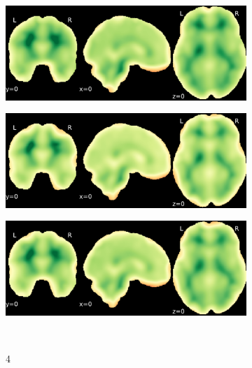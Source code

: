 \documentclass{article}
\begin{document}
\begin{landscape}
\begin{figure}
\begin{subfigure}[t]{0.2\paperheight}
        \end{subfigure}
        \begin{subfigure}[t]{0.2\paperheight}
            \centering
            \includegraphics[width=\textwidth]{figures/sig/15mm/rr_ds000256_sub-CTS201_sig.pdf}
        \end{subfigure}
        \begin{subfigure}[t]{0.2\paperheight}
            \centering
            \includegraphics[width=\textwidth]{figures/sig/15mm/rs_ds000256_sub-CTS201_sig.pdf}
        \end{subfigure}
        \begin{subfigure}[t]{0.2\paperheight}
            \centering
            \includegraphics[width=\textwidth]{figures/sig/15mm/rr.rs_ds000256_sub-CTS201_sig.pdf}
        \end{subfigure} \\
        \begin{subfigure}[b][][c]{0.01\paperwidth} 4 \vspace*{15pt} \end{subfigure}

\end{figure}
\end{landscape}
\end{document}
